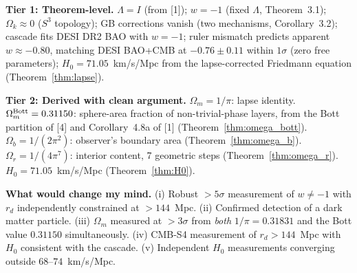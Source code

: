 \documentclass[12pt,a4paper]{article}
\begin{document}
\textbf{Tier 1: Theorem-level.} $\Lambda = I$ (from [1]); $w = -1$ (fixed $\Lambda$,
Theorem~3.1); $\Omega_k \approx 0$ ($S^3$ topology); GB corrections vanish (two mechanisms,
Corollary~3.2); cascade fits DESI DR2 BAO with $w = -1$; ruler mismatch predicts apparent
$w \approx -0.80$, matching DESI BAO+CMB at $-0.76 \pm 0.11$ within $1\sigma$ (zero free
parameters); $H_0 = 71.05$~km/s/Mpc from the lapse-corrected Friedmann equation
(Theorem~\ref{thm:lapse}).

\textbf{Tier 2: Derived with clean argument.} $\Omega_m = 1/\pi$: lapse identity.
$\Omega_m^{\rm Bott} = 0.31150$: sphere-area fraction of non-trivial-phase layers, from the
Bott partition of [4] and Corollary~4.8a of [1] (Theorem~\ref{thm:omega_bott}).
$\Omega_b = 1/(2\pi^2)$: observer's boundary area (Theorem~\ref{thm:omega_b}).
$\Omega_r = 1/(4\pi^7)$: interior content, 7 geometric steps (Theorem~\ref{thm:omega_r}).
$H_0 = 71.05$~km/s/Mpc (Theorem~\ref{thm:H0}).

\textbf{What would change my mind.} (i) Robust $> 5\sigma$ measurement of $w \neq -1$ with
$r_d$ independently constrained at $> 144$~Mpc. (ii) Confirmed detection of a dark matter
particle. (iii) $\Omega_m$ measured at $> 3\sigma$ from \emph{both} $1/\pi = 0.31831$ and
the Bott value $0.31150$ simultaneously. (iv) CMB-S4 measurement of $r_d > 144$~Mpc with
$H_0$ consistent with the cascade. (v) Independent $H_0$ measurements converging outside
$68$--$74$~km/s/Mpc.
\end{document}

